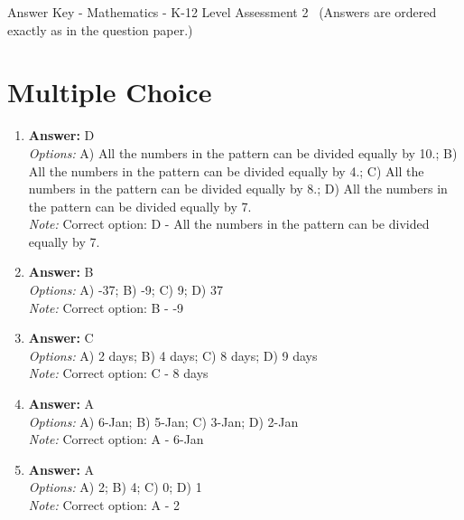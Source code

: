 \documentclass[12pt]{article}
\begin{document}
\begin{center}
Answer Key - Mathematics - K-12 Level Assessment 2 \
\small (Answers are ordered exactly as in the question paper.)
\end{center}

\section*{Multiple Choice}
\begin{enumerate}[label=\arabic*.]
\item \textbf{Answer:} D
\\ \textit{Options:} A) All the numbers in the pattern can be divided equally by 10.; B) All the numbers in the pattern can be divided equally by 4.; C) All the numbers in the pattern can be divided equally by 8.; D) All the numbers in the pattern can be divided equally by 7.
\\ \textit{Note:} Correct option: D - All the numbers in the pattern can be divided equally by 7.
\item \textbf{Answer:} B
\\ \textit{Options:} A) -37; B) -9; C) 9; D) 37
\\ \textit{Note:} Correct option: B - -9
\item \textbf{Answer:} C
\\ \textit{Options:} A) 2 days; B) 4 days; C) 8 days; D) 9 days
\\ \textit{Note:} Correct option: C - 8 days
\item \textbf{Answer:} A
\\ \textit{Options:} A) 6-Jan; B) 5-Jan; C) 3-Jan; D) 2-Jan
\\ \textit{Note:} Correct option: A - 6-Jan
\item \textbf{Answer:} A
\\ \textit{Options:} A) 2; B) 4; C) 0; D) 1
\\ \textit{Note:} Correct option: A - 2
\end{enumerate}
\end{document}
